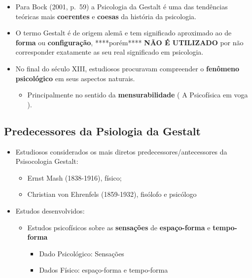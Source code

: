 \documentclass[
]{book}
\providecommand{\tightlist}{%
  \setlength{\itemsep}{0pt}\setlength{\parskip}{0pt}}
\begin{document}
\begin{itemize}
\tightlist
\item
  Para Bock (2001, p.~59) a Psicologia da Gestalt é uma das tendências teóricas mais \textbf{coerentes} e \textbf{coesas} da história da psicologia.
\item
  O termo Gestalt é de origem alemã e tem significado aproximado ao de \textbf{forma} ou \textbf{configuração}, ****porém**** \textbf{NÃO É UTILIZADO} por não corresponder exatamente as seu real significado em psicologia.
\item
  No final do século XIII, estudiosos procuravam compreender o \textbf{fenômeno psicológico} em seus aspectos naturais.

  \begin{itemize}
  \tightlist
  \item
    Principalmente no sentido da \textbf{mensurabilidade} ( A Psicofísica em voga ).
  \end{itemize}
\end{itemize}

\hypertarget{predecessores-da-psiologia-da-gestalt}{%
\subsection{Predecessores da Psiologia da Gestalt}\label{predecessores-da-psiologia-da-gestalt}}

\begin{itemize}
\tightlist
\item
  Estudiosos considerados os mais diretos predecessores/antecessores da Psisocologia Gestalt:

  \begin{itemize}
  \tightlist
  \item
    Ernst Mash (1838-1916), físico;
  \item
    Christian von Ehrenfels (1859-1932), fisólofo e psicólogo
  \end{itemize}
\item
  Estudos desenvolvidos:

  \begin{itemize}
  \tightlist
  \item
    Estudos psicofísicos sobre as \textbf{sensações} de \textbf{espaço-forma} e \textbf{tempo-forma}

    \begin{itemize}
    \tightlist
    \item
      Dado Psicológico: Sensações
    \item
      Dados Físico: espaço-forma e tempo-forma
    \end{itemize}
  \end{itemize}
\end{itemize}
\end{document}
